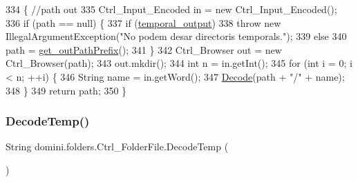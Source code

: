 \begin{DoxyCode}
334                                              \{ \textcolor{comment}{//path out }
335         Ctrl\_Input\_Encoded in = \textcolor{keyword}{new} Ctrl\_Input\_Encoded();
336         \textcolor{keywordflow}{if} (path == null) \{
337             \textcolor{keywordflow}{if} (\hyperlink{classdomini_1_1folders_1_1Ctrl__FolderFile_a0db81590abe27b21a9b8c37633c86fa6}{temporal\_output})
338                 \textcolor{keywordflow}{throw} \textcolor{keyword}{new} IllegalArgumentException(\textcolor{stringliteral}{"No podem desar directoris temporals."});
339             \textcolor{keywordflow}{else}
340                 path = \hyperlink{classdomini_1_1folders_1_1Ctrl__FolderFile_a11c6b1b4a25d12b8091c7c96b3da1ea7}{get\_outPathPrefix}();
341         \}
342         Ctrl\_Browser out = \textcolor{keyword}{new} Ctrl\_Browser(path);
343         out.mkdir();
344         \textcolor{keywordtype}{int} n = in.getInt();
345         \textcolor{keywordflow}{for} (\textcolor{keywordtype}{int} i = 0; i < n; ++i) \{
346             String name = in.getWord();
347             \hyperlink{classdomini_1_1folders_1_1Ctrl__FolderFile_a5d28ac7f5223ecd40a242148e86447c1}{Decode}(path + \textcolor{stringliteral}{"/"} + name);
348         \}
349         \textcolor{keywordflow}{return} path;
350     \}
\end{DoxyCode}
\mbox{\label{classdomini_1_1folders_1_1Ctrl__FolderFile_afa0f6968113855feccccfdbacc00444e}} 
\subsubsection{\texorpdfstring{Decode\+Temp()}{DecodeTemp()}}
{\footnotesize\ttfamily String domini.\+folders.\+Ctrl\+\_\+\+Folder\+File.\+Decode\+Temp (\begin{DoxyParamCaption}{ }\end{DoxyParamCaption})\hspace{0.3cm}{\ttfamily [inline]}}


